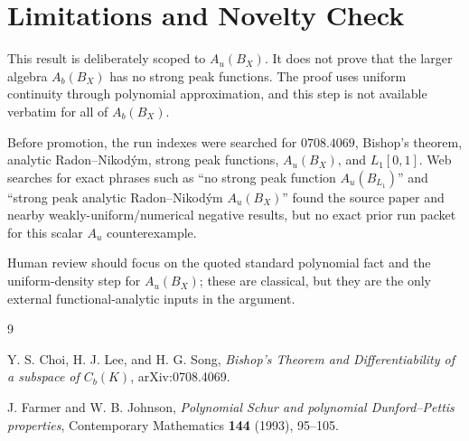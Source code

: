 \documentclass[11pt]{article}
\begin{document}
\section*{Limitations and Novelty Check}

This result is deliberately scoped to \(A_u(B_X)\). It does not prove that
the larger algebra \(A_b(B_X)\) has no strong peak functions. The proof uses
uniform continuity through polynomial approximation, and this step is not
available verbatim for all of \(A_b(B_X)\).

Before promotion, the run indexes were searched for \(0708.4069\), Bishop's
theorem, analytic Radon--Nikod\'ym, strong peak functions, \(A_u(B_X)\), and
\(L_1[0,1]\). Web searches for exact phrases such as ``no strong peak
function \(A_u(B_{L_1})\)'' and ``strong peak analytic Radon--Nikod\'ym
\(A_u(B_X)\)'' found the source paper and nearby weakly-uniform/numerical
negative results, but no exact prior run packet for this scalar \(A_u\)
counterexample.

Human review should focus on the quoted standard polynomial fact and the
uniform-density step for \(A_u(B_X)\); these are classical, but they are the
only external functional-analytic inputs in the argument.

\begin{thebibliography}{9}

Y. S. Choi, H. J. Lee, and H. G. Song,
\emph{Bishop's Theorem and Differentiability of a subspace of \(C_b(K)\)},
arXiv:0708.4069.

J. Farmer and W. B. Johnson,
\emph{Polynomial Schur and polynomial Dunford--Pettis properties},
Contemporary Mathematics \textbf{144} (1993), 95--105.

\end{thebibliography}
\end{document}
